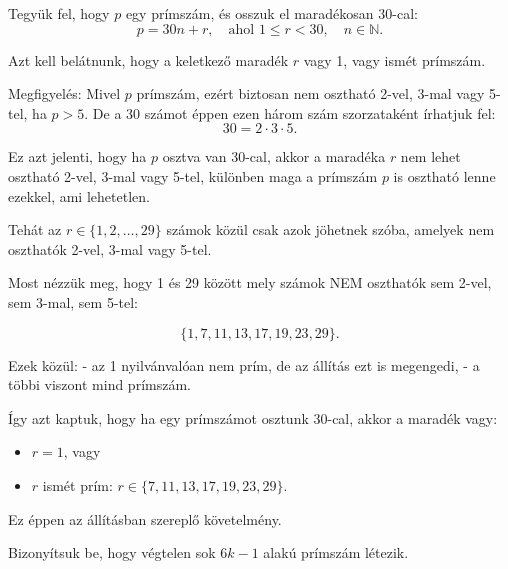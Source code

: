 \begin{solution}
Tegyük fel, hogy $p$ egy prímszám, és osszuk el maradékosan 30-cal:
\[
p=30n+r,\quad\text{ahol }1\leq r<30,\quad n\in\mathbb{N}.
\]

Azt kell belátnunk, hogy a keletkező maradék $r$ vagy 1, vagy ismét
prímszám.

Megfigyelés: Mivel $p$ prímszám, ezért biztosan nem osztható 2-vel,
3-mal vagy 5-tel, ha $p>5$. De a 30 számot éppen ezen három szám
szorzataként írhatjuk fel: 
\[
30=2\cdot3\cdot5.
\]

Ez azt jelenti, hogy ha $p$ osztva van 30-cal, akkor a maradéka $r$
nem lehet osztható 2-vel, 3-mal vagy 5-tel, különben maga a prímszám
$p$ is osztható lenne ezekkel, ami lehetetlen.

Tehát az $r\in\{1,2,\dots,29\}$ számok közül csak azok jöhetnek szóba,
amelyek nem oszthatók 2-vel, 3-mal vagy 5-tel.

Most nézzük meg, hogy 1 és 29 között mely számok NEM oszthatók sem
2-vel, sem 3-mal, sem 5-tel:

\[
\{1,7,11,13,17,19,23,29\}.
\]

Ezek közül: - az 1 nyilvánvalóan nem prím, de az állítás ezt is megengedi,
- a többi viszont mind prímszám.

Így azt kaptuk, hogy ha egy prímszámot osztunk 30-cal, akkor a maradék
vagy: 
\begin{itemize}
\item $r=1$, vagy 
\item $r$ ismét prím: $r\in\{7,11,13,17,19,23,29\}$. 
\end{itemize}
Ez éppen az állításban szereplő követelmény.
\end{solution}
\begin{problem}
Bizonyítsuk be, hogy végtelen sok $6k-1$ alakú prímszám létezik. 
\end{problem}

